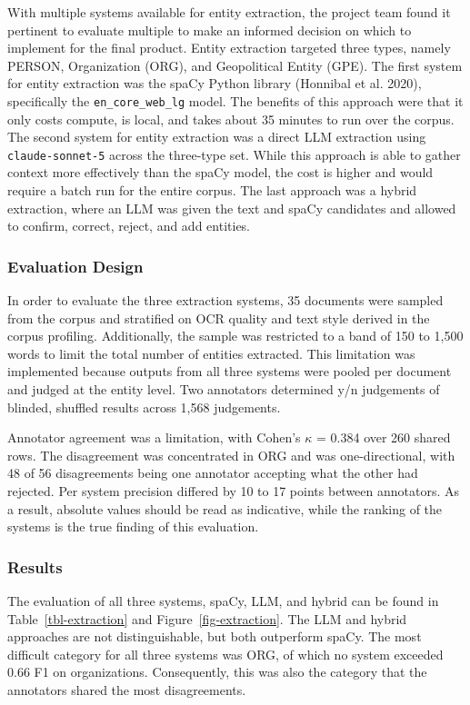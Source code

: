 \documentclass[
  letterpaper,
  DIV=11,
  numbers=noendperiod]{scrartcl}
\begin{document}
With multiple systems available for entity extraction, the project team
found it pertinent to evaluate multiple to make an informed decision on
which to implement for the final product. Entity extraction targeted
three types, namely PERSON, Organization (ORG), and Geopolitical Entity
(GPE). The first system for entity extraction was the spaCy Python
library (Honnibal et al. 2020), specifically the
\texttt{en\_core\_web\_lg} model. The benefits of this approach were
that it only costs compute, is local, and takes about 35 minutes to run
over the corpus. The second system for entity extraction was a direct
LLM extraction using \texttt{claude-sonnet-5} across the three-type set.
While this approach is able to gather context more effectively than the
spaCy model, the cost is higher and would require a batch run for the
entire corpus. The last approach was a hybrid extraction, where an LLM
was given the text and spaCy candidates and allowed to confirm, correct,
reject, and add entities.

\subsubsection{Evaluation Design}\label{evaluation-design}

In order to evaluate the three extraction systems, 35 documents were
sampled from the corpus and stratified on OCR quality and text style
derived in the corpus profiling. Additionally, the sample was restricted
to a band of 150 to 1,500 words to limit the total number of entities
extracted. This limitation was implemented because outputs from all
three systems were pooled per document and judged at the entity level.
Two annotators determined y/n judgements of blinded, shuffled results
across 1,568 judgements.

Annotator agreement was a limitation, with Cohen's \(\kappa\) = 0.384
over 260 shared rows. The disagreement was concentrated in ORG and was
one-directional, with 48 of 56 disagreements being one annotator
accepting what the other had rejected. Per system precision differed by
10 to 17 points between annotators. As a result, absolute values should
be read as indicative, while the ranking of the systems is the true
finding of this evaluation.

\subsubsection{Results}\label{sec-extraction-results}

The evaluation of all three systems, spaCy, LLM, and hybrid can be found
in Table~\ref{tbl-extraction} and Figure~\ref{fig-extraction}. The LLM
and hybrid approaches are not distinguishable, but both outperform
spaCy. The most difficult category for all three systems was ORG, of
which no system exceeded 0.66 F1 on organizations. Consequently, this
was also the category that the annotators shared the most disagreements.
\end{document}
